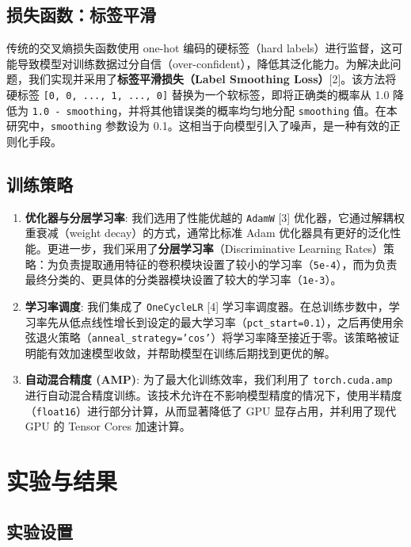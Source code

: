 \documentclass[UTF8]{ctexart}
\begin{document}
\subsection{损失函数：标签平滑}

传统的交叉熵损失函数使用 one-hot 编码的硬标签（hard labels）进行监督，这可能导致模型对训练数据过分自信（over-confident），降低其泛化能力。为解决此问题，我们实现并采用了\textbf{标签平滑损失（Label Smoothing Loss）}[2]。该方法将硬标签 \texttt{[0, 0, ..., 1, ..., 0]} 替换为一个软标签，即将正确类的概率从 1.0 降低为 \texttt{1.0 - smoothing}，并将其他错误类的概率均匀地分配 \texttt{smoothing} 值。在本研究中，\texttt{smoothing} 参数设为 0.1。这相当于向模型引入了噪声，是一种有效的正则化手段。

\subsection{训练策略}

\begin{enumerate}
    \item \textbf{优化器与分层学习率}: 我们选用了性能优越的 \texttt{AdamW} [3] 优化器，它通过解耦权重衰减（weight decay）的方式，通常比标准 Adam 优化器具有更好的泛化性能。更进一步，我们采用了\textbf{分层学习率}（Discriminative Learning Rates）策略：为负责提取通用特征的卷积模块设置了较小的学习率（\texttt{5e-4}），而为负责最终分类的、更具体的分类器模块设置了较大的学习率（\texttt{1e-3}）。
    \item \textbf{学习率调度}: 我们集成了 \texttt{OneCycleLR} [4] 学习率调度器。在总训练步数中，学习率先从低点线性增长到设定的最大学习率（\texttt{pct\_start=0.1}），之后再使用余弦退火策略（\texttt{anneal\_strategy='cos'}）将学习率降至接近于零。该策略被证明能有效加速模型收敛，并帮助模型在训练后期找到更优的解。
    \item \textbf{自动混合精度 (AMP)}: 为了最大化训练效率，我们利用了 \texttt{torch.cuda.amp} 进行自动混合精度训练。该技术允许在不影响模型精度的情况下，使用半精度（\texttt{float16}）进行部分计算，从而显著降低了 GPU 显存占用，并利用了现代 GPU 的 Tensor Cores 加速计算。
\end{enumerate}

\section{实验与结果}

\subsection{实验设置}
\end{document}
